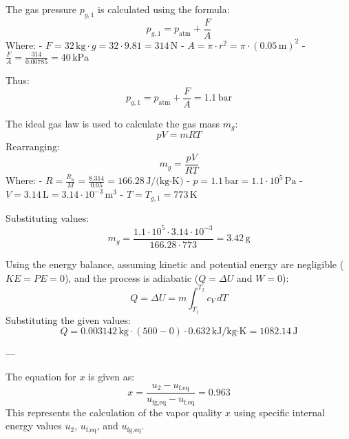 The gas pressure \( p_{g,1} \) is calculated using the formula:  
\[
p_{g,1} = p_{\text{atm}} + \frac{F}{A}
\]  
Where:  
- \( F = 32 \, \text{kg} \cdot g = 32 \cdot 9.81 = 314 \, \text{N} \)  
- \( A = \pi \cdot r^2 = \pi \cdot (0.05 \, \text{m})^2 \)  
- \( \frac{F}{A} = \frac{314}{0.00785} = 40 \, \text{kPa} \)  

Thus:  
\[
p_{g,1} = p_{\text{atm}} + \frac{F}{A} = 1.1 \, \text{bar}
\]  

The ideal gas law is used to calculate the gas mass \( m_g \):  
\[
p V = m R T
\]  
Rearranging:  
\[
m_g = \frac{p V}{R T}
\]  
Where:  
- \( R = \frac{R_u}{M} = \frac{8.314}{0.05} = 166.28 \, \text{J/(kg·K)} \)  
- \( p = 1.1 \, \text{bar} = 1.1 \cdot 10^5 \, \text{Pa} \)  
- \( V = 3.14 \, \text{L} = 3.14 \cdot 10^{-3} \, \text{m}^3 \)  
- \( T = T_{g,1} = 773 \, \text{K} \)  

Substituting values:  
\[
m_g = \frac{1.1 \cdot 10^5 \cdot 3.14 \cdot 10^{-3}}{166.28 \cdot 773} = 3.42 \, \text{g}
\]

Using the energy balance, assuming kinetic and potential energy are negligible (\( KE = PE = 0 \)), and the process is adiabatic (\( Q = \Delta U \) and \( W = 0 \)):  
\[
Q = \Delta U = m \int_{T_1}^{T_2} c_V \, dT
\]  
Substituting the given values:  
\[
Q = 0.003142 \, \text{kg} \cdot (500 - 0) \cdot 0.632 \, \text{kJ/kg·K} = 1082.14 \, \text{J}
\]  

---

The equation for \( x \) is given as:  
\[
x = \frac{u_2 - u_{\text{f,eq}}}{u_{\text{fg,eq}} - u_{\text{f,eq}}} = 0.963
\]  
This represents the calculation of the vapor quality \( x \) using specific internal energy values \( u_2 \), \( u_{\text{f,eq}} \), and \( u_{\text{fg,eq}} \).